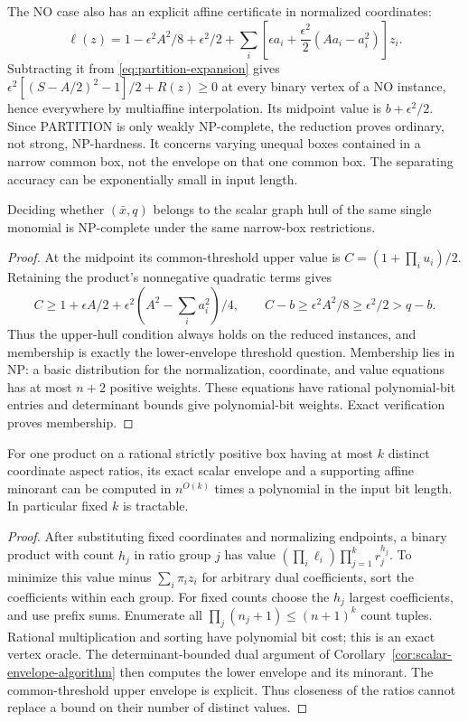 The NO case also has an explicit affine certificate in normalized
coordinates:
\begin{equation}\label{eq:partition-dual}
 \ell(z)=1-\epsilon^2A^2/8+\epsilon^2/2
    +\sum_i\left[\epsilon a_i+\frac{\epsilon^2}{2}(Aa_i-a_i^2)\right]z_i.
\end{equation}
Subtracting it from \eqref{eq:partition-expansion} gives
$\epsilon^2[(S-A/2)^2-1]/2+R(z)\ge0$ at every binary vertex of a
NO instance, hence everywhere by multiaffine interpolation. Its midpoint
value is $b+\epsilon^2/2$.
Since PARTITION is only weakly NP-complete, the reduction proves
ordinary, not strong, NP-hardness. It concerns varying unequal boxes
contained in a narrow common box, not the envelope on that one common
box. The separating accuracy can be exponentially small in input length.

\begin{corollary}\label{cor:single-product-membership}
Deciding whether $(\bar x,q)$ belongs to the scalar graph hull of the
same single monomial is NP-complete under the same narrow-box restrictions.
\end{corollary}
\begin{proof}
At the midpoint its common-threshold upper value is
$C=(1+\prod_i u_i)/2$. Retaining the product's nonnegative quadratic
terms gives
\[
 C\ge1+\epsilon A/2+\epsilon^2(A^2-\sum_i a_i^2)/4,
 \qquad C-b\ge\epsilon^2A^2/8\ge\epsilon^2/2>q-b.
\]
Thus the upper-hull condition always holds on the reduced instances,
and membership is exactly the lower-envelope threshold question.
Membership lies in NP: a basic distribution for the normalization,
coordinate, and value equations has at most $n+2$ positive weights.
These equations have rational polynomial-bit entries and determinant
bounds give polynomial-bit weights. Exact verification proves membership.
\end{proof}

\begin{proposition}\label{prop:ratio-types}
For one product on a rational strictly positive box having at most $k$
distinct coordinate aspect ratios, its exact scalar envelope and a
supporting affine minorant can be computed in $n^{O(k)}$ times a
polynomial in the input bit length. In particular fixed $k$ is tractable.
\end{proposition}
\begin{proof}
After substituting fixed coordinates and normalizing endpoints, a
binary product with count $h_j$ in ratio group $j$ has value
$(\prod_i\ell_i)\prod_{j=1}^k r_j^{h_j}$. To minimize this value minus
$\sum_i\pi_i z_i$ for arbitrary dual coefficients, sort the coefficients
within each group. For fixed counts choose the $h_j$ largest coefficients,
and use prefix sums. Enumerate all $\prod_j(n_j+1)\le(n+1)^k$ count
tuples. Rational multiplication and sorting have polynomial bit cost;
this is an exact vertex oracle. The determinant-bounded dual argument
of Corollary~\ref{cor:scalar-envelope-algorithm} then computes the lower
envelope and its minorant. The common-threshold upper envelope is
explicit. Thus closeness of the ratios cannot replace a bound on their number of
distinct values.
\end{proof}

